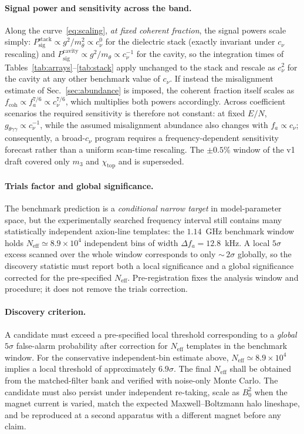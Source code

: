 \documentclass[11pt,a4paper]{article}
\begin{document}
\paragraph{Signal power and sensitivity across the band.} Along the
curve~\eqref{eq:scaling}, \emph{at fixed coherent fraction}, the signal
powers scale simply: $P_{\mathrm{sig}}^{\mathrm{stack}} \propto g^2/m_\theta^2
\propto c_\nu^{0}$ for the dielectric stack (exactly invariant under $c_\nu$
rescaling) and $P_{\mathrm{sig}}^{\mathrm{cavity}} \propto g^2/m_\theta
\propto c_\nu^{-1}$ for the cavity, so the integration times of
Tables~\ref{tab:arrays}--\ref{tab:stack} apply unchanged to the stack and
rescale as $c_\nu^2$ for the cavity at any other benchmark value of $c_\nu$.
If instead the misalignment estimate of Sec.~\ref{sec:abundance} is imposed,
the coherent fraction itself scales as $f_{\mathrm{coh}} \propto f_a^{7/6}
\propto c_\nu^{7/6}$, which multiplies both powers accordingly. Across
coefficient scenarios the required sensitivity is therefore not constant: at
fixed $E/N$, $g_{\theta\gamma\gamma} \propto c_\nu^{-1}$, while the assumed
misalignment abundance also changes with $f_a \propto c_\nu$; consequently, a
broad-$c_\nu$ program requires a frequency-dependent sensitivity forecast
rather than a uniform scan-time rescaling. The $\pm 0.5\%$ window of the v1
draft covered only $m_3$ and $\chi_{\mathrm{top}}$ and is superseded.

\paragraph{Trials factor and global significance.} The benchmark prediction
is a \emph{conditional narrow target} in model-parameter space, but the
experimentally searched frequency interval still contains many statistically
independent axion-line templates: the $1.14$~GHz benchmark window holds
$N_{\mathrm{eff}} \simeq 8.9\times 10^{4}$ independent bins of width
$\Delta f_a = 12.8$~kHz. A local $5\sigma$ excess scanned over the whole
window corresponds to only ${\sim}\,2\sigma$ globally, so the discovery
statistic must report both a local significance and a global significance
corrected for the pre-specified $N_{\mathrm{eff}}$. Pre-registration fixes
the analysis window and procedure; it does not remove the trials correction.

\paragraph{Discovery criterion.} A candidate must exceed a pre-specified
local threshold corresponding to a \emph{global} $5\sigma$ false-alarm
probability after correction for $N_{\mathrm{eff}}$ templates in the
benchmark window. For the conservative independent-bin estimate above,
$N_{\mathrm{eff}} \simeq 8.9\times 10^{4}$ implies a local threshold of
approximately $6.9\sigma$. The final $N_{\mathrm{eff}}$ shall be obtained
from the matched-filter bank and verified with noise-only Monte Carlo. The
candidate must also persist under independent re-taking, scale as $B_0^2$
when the magnet current is varied, match the expected Maxwell--Boltzmann halo
lineshape, and be reproduced at a second apparatus with a different magnet
before any claim.
\end{document}
